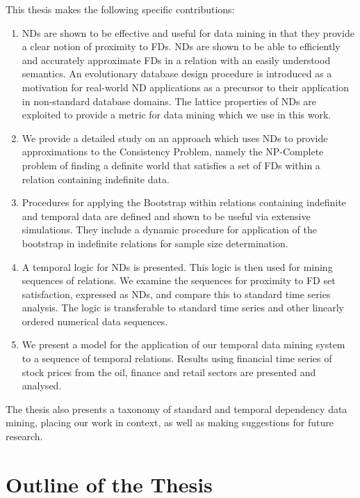 \smallskip
\noindent This thesis makes the following specific contributions:
\begin{enumerate}
\item NDs are shown to be effective and useful for 
data mining in that they provide a clear notion of proximity to FDs.
NDs are shown to be able to efficiently and accurately approximate FDs
in a relation with an easily understood semantics. 
An evolutionary database design procedure is introduced as a 
motivation for real-world ND applications as a precursor to their application
in non-standard database domains. The lattice properties of NDs are
exploited to provide a metric for data mining which we use in this work. 
\item We provide a detailed study on an approach which uses NDs to
provide approximations to the Consistency Problem, namely the
NP-Complete problem of finding a definite world that satisfies a set
of FDs within a relation containing indefinite data. 
\item Procedures for applying the Bootstrap within relations containing
indefinite and temporal data are defined and shown to be useful via extensive
simulations. They include a dynamic procedure for application of the
bootstrap in indefinite relations for sample size determination. 
\item A temporal logic for NDs is presented. This logic is then used
for mining sequences of relations. We examine the sequences for proximity
to FD set satisfaction, expressed as NDs, and compare this
to standard time series 
analysis. The logic is transferable to standard time series and other
linearly ordered numerical data sequences.
\item We present a model for the application of our temporal data
mining system to a sequence of temporal relations. Results using
financial time series of stock prices from the oil,
finance and retail sectors are presented and analysed.
\end{enumerate}

The thesis also presents a taxonomy of standard and temporal 
dependency data mining, placing our work in context, as well as making
suggestions for future research. 

\section{Outline of the Thesis}\label{sec:int_outline}

